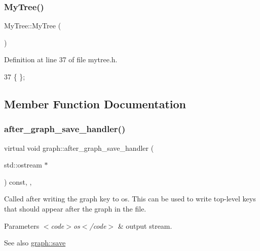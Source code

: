 \subsubsection{\texorpdfstring{My\+Tree()}{MyTree()}}
{\footnotesize\ttfamily My\+Tree\+::\+My\+Tree (\begin{DoxyParamCaption}{ }\end{DoxyParamCaption})\hspace{0.3cm}{\ttfamily [inline]}}



Definition at line 37 of file mytree.\+h.


\begin{DoxyCode}
37 \{ \};
\end{DoxyCode}


\subsection{Member Function Documentation}
\mbox{\label{classgraph_af0c7aba21d57d827ae96cae632441651}} 
\subsubsection{\texorpdfstring{after\+\_\+graph\+\_\+save\+\_\+handler()}{after\_graph\_save\_handler()}}
{\footnotesize\ttfamily virtual void graph\+::after\+\_\+graph\+\_\+save\+\_\+handler (\begin{DoxyParamCaption}\item[{std\+::ostream $\ast$}]{ }\end{DoxyParamCaption}) const\hspace{0.3cm}{\ttfamily [inline]}, {\ttfamily [virtual]}, {\ttfamily [inherited]}}

Called after writing the graph key to {\ttfamily os}. This can be used to write top-\/level keys that should appear after the graph in the file.


\begin{DoxyParams}{Parameters}
{\em $<$code$>$os$<$/code$>$} & output stream. \\
\hline
\end{DoxyParams}
\begin{DoxySeeAlso}{See also}
\mbox{\hyperlink{classgraph_a7bd0712a528249d1585085a64ac3e661}{graph\+::save}} 
\end{DoxySeeAlso}



